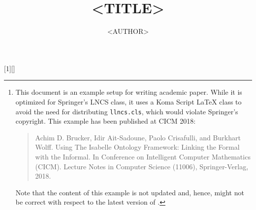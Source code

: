 


%
%
\usepackage{textcomp}
\usepackage{xcolor}
\usepackage{paralist}
\usepackage{listings}
\usepackage{lstisadof}
\usepackage{xspace}
\usepackage[draft]{fixme}

%

[1][]{\lstset{style=displaybash, #1}}{}
\def\inlinebash{\lstinline[style=bash, breaklines=true,columns=fullflexible]}

\usepackage[caption]{subfig}
\usepackage[size=footnotesize]{caption}


\subject{Example of an Academic Paper\footnote{%
  This document is an example setup for writing academic paper. While
  it is optimized for Springer's LNCS class, it uses a Koma Script
  LaTeX class to avoid the need for distributing \texttt{llncs.cls},
  which would violate Springer's copyright. This example has been
  published at CICM 2018:
    \protect\begin{quote}
      Achim D. Brucker, Idir Ait-Sadoune, Paolo Crisafulli, and
      Burkhart Wolff. Using The Isabelle Ontology Framework: Linking
      the Formal with the Informal. In Conference on Intelligent
      Computer Mathematics (CICM). Lecture Notes in Computer Science
      (11006), Springer-Verlag, 2018. 
    \protect\end{quote}
    Note that the content of this example is not updated and, hence,
    might not be correct with respect to the latest version of
    \isadof{}. 
    }}


\title{<TITLE>}
\author{<AUTHOR>}

